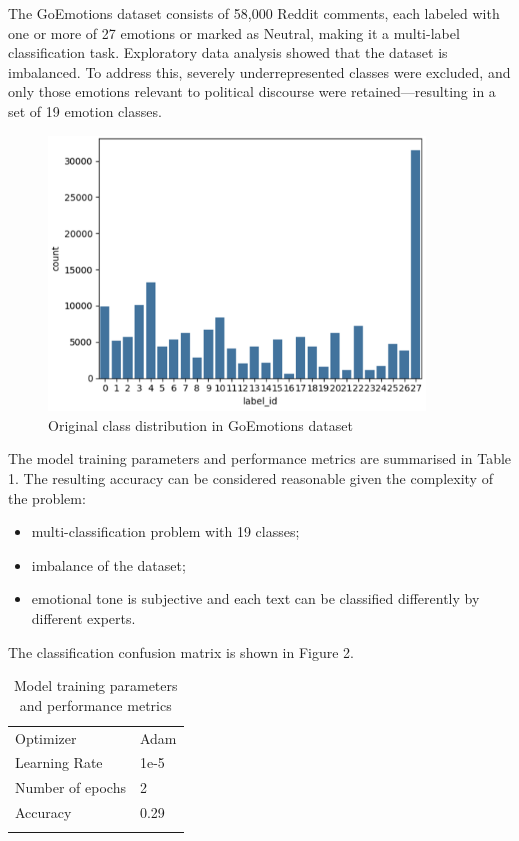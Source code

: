 \documentclass[pdflatex,sn-mathphys-num]{sn-jnl}%
\begin{document}
The GoEmotions dataset consists of 58,000 Reddit comments, each labeled with one or more of 27 emotions or marked as Neutral, making it a multi-label classification task.
Exploratory data analysis showed that the dataset is imbalanced. To address this, severely underrepresented classes were excluded, and only those emotions relevant to political discourse were retained—resulting in a set of 19 emotion classes.
\begin{figure}[h]
	\centering
	\includegraphics[width=10cm]{f1-label_distribution.png}
	\caption{Original class distribution in GoEmotions dataset}
\end{figure}

The model training parameters and performance metrics are summarised in Table 1.
The resulting accuracy can be considered reasonable given the complexity of the problem:
\begin{itemize}
	\item multi-classification problem with 19 classes; 
	\item imbalance of the dataset;
	\item emotional tone is subjective and each text can be classified differently by different experts.
\end{itemize}

The classification confusion matrix is shown in Figure 2.
\begin{table}[h]
	\caption{Model training parameters and performance metrics}\label{tab_2-1}%
	\begin{tabular}{@{}p{4cm}p{4cm}}
		\toprule
		Optimizer & Adam \\ 
		Learning Rate & 1e-5 \\ 
		Number of epochs & 2 \\
		Accuracy & 0.29\\ 
		\botrule
	\end{tabular}
\end{table}
\end{document}
